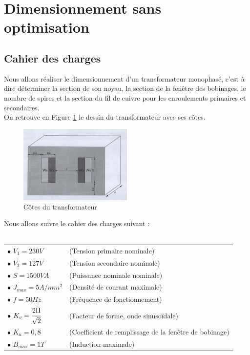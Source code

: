 \section{Dimensionnement sans optimisation}
\subsection{Cahier des charges}
Nous allons réaliser le dimensionnement d'un transformateur monophasé, c'est à dire déterminer la section de son noyau, la section de la fenêtre des bobinages, le nombre de spires et la section du fil de cuivre pour les enroulements primaires et secondaires.\\
On retrouve en Figure \ref{img:cotesTransfo} le dessin du transformateur avec ses côtes.\\

\begin{figure}[h]
	\begin{center}
	\includegraphics[width=0.5\textwidth]{images/dessin_init_transfo.jpg}
	\caption{Côtes du transformateur}\label{img:cotesTransfo}
	\end{center}
\end{figure}
\FloatBarrier

Nous allons suivre le cahier des charges suivant : \\~\\
\begin{tabular}{l l}
 $\bullet $ $V_1 = 230 V$	&(Tension primaire nominale)\\
 $\bullet $ $V_2 = 127 V$	&(Tension secondaire nominale)\\
 $\bullet $ $S = 1500 VA$	&(Puissance nominale nominale)\\
 $\bullet $ $J_{max} = 5 A/mm^2$	&(Densité de courant maximale)\\
 $\bullet $ $f = 50Hz$		&(Fréquence de fonctionnement)\\
 $\bullet $ $K_v = \cfrac{2\Pi}{\sqrt{2}}$	&(Facteur de forme, onde sinusoïdale)\\
 $\bullet $ $K_u = 0,8 $	&(Coefficient de remplissage de la fenêtre de bobinage)\\
 $\bullet $ $B_{max} = 1T$	&(Induction maximale)
\end{tabular}


